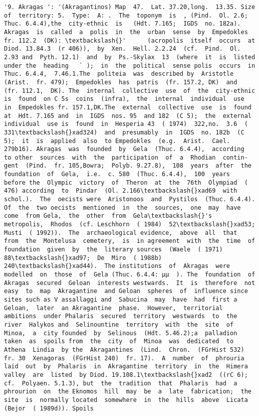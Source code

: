 \documentclass[11pt]{article}
\begin{document}
\begin{Verbatim}[commandchars=\\\{\}]
         '9. Akragas ': '(Akragantinos) Map  47.  Lat. 37.20,long.  13.35. Size of  territory: 5.  Type:  A: .  The  toponym  is  , (Pind.  Ol. 2.6;  Thuc. 6.4.4),the  city-ethnic  is   (Hdt. 7.165;  IGDS  no. 182a). Akragas  is  called  a  polis  in  the  urban  sense  by  Empedokles fr. 112.2  (DK): \textbackslash{}'      (acropolis  itself  occurs  at Diod. 13.84.3  (r 406)),  by  Xen.  Hell. 2.2.24  (cf.  Pind.  Ol. 2.93 and  Pyth. 12.1)  and  by  Ps.-Skylax  13  (where  it  is  listed  under the  heading   ` );  in  the  political  sense polis  occurs  in  Thuc. 6.4.4,  7.46.1.The  politeia  was  described by  Aristotle  (Arist.  fr. 479);  Empedokles  has  patris  (fr. 157.2, DK)  and  (fr. 112.1,  DK). The  internal  collective  use  of  the  city-ethnic  is  found  on C 5s  coins  (infra),  the  internal  individual  use  in  Empedokles fr. 157.1,DK.The  external  collective  use  is  found  at  Hdt. 7.165 and  in  IGDS  nos. 95  and 182  (C 5);  the  external  individual  use is  found  in  Hesperia 43  ( 1974)  322,no.  3.6  ( 331\textbackslash{}xad324)  and  presumably  in  IGDS  no. 182b  (C 5);  it  is  applied  also  to Empedokles  (e.g.  Arist.  Cael. 279b16). Akragas  was  founded  by  Gela  (Thuc. 6.4.4),  according  to other  sources  with  the  participation  of  a  Rhodian  contin- gent  (Pind.  fr. 105,Bowra;  Polyb. 9.27.8),  108  years  after  the foundation  of  Gela,  i.e.  c. 580  (Thuc. 6.4.4),  100  years  before the  Olympic  victory  of  Theron  at  the  76th  Olympiad  ( 476) according  to  Pindar  (Ol. 2.166\textbackslash{}xad69  with  schol.).  The  oecists were  Aristonoos  and  Pystilos  (Thuc. 6.4.4).  Of  the  two oecists  mentioned  in  the  sources,  one  may  have  come  from Gela,  the  other  from  Gela\textbackslash{}'s  metropolis,  Rhodos  (cf. Leschhorn  ( 1984)  52\textbackslash{}xad53;  Musti  ( 1992)).  The  archaeological evidence,  above  all  that  from  the  Montelusa  cemetery,  is  in agreement  with  the  time  of  foundation  given  by  the  literary sources  (Waele  ( 1971)  88\textbackslash{}xad97;  De  Miro  ( 1988b)  240\textbackslash{}xad44).  The institutions  of  Akragas  were  modelled  on  those  of  Gela (Thuc. 6.4.4: µµ  ). The  foundation  of  Akragas  secured  Geloan  interests westwards.  It  is  therefore  not  easy  to  map  Akragantine  and Geloan  spheres  of  influence since sites such as V assallaggi and  Sabucina  may  have  had  first a Geloan,  later  an Akragantine  phase.  However,  territorial  ambitions  under Phalaris  secured  territory  westwards  to  the  river  Halykos and  Selinountine  territory  with  the  site  of  Minoa,  a  city founded  by  Selinous  (Hdt. 5.46.2);a  palladion  taken  as  spoils from  the  city  of  Minoa  was  dedicated  to  Athena  Lindia  by the  Akragantines  (Lind.  Chron.  (FGrHist 532)  fr. 30  Xenagoras  (FGrHist 240)  fr. 17).  A  number  of  phrouria laid  out  by  Phalaris  in  Akragantine  territory  in  the  Himera valley  are  listed  by Diod. 19.108.1\textbackslash{}xad2  ((rC 6);  cf.  Polyaen. 5.1.3), but  the  tradition  that  Phalaris  had  a  phrourion  on  the Eknomos  hill  may  be  a  late  fabrication;  the  site  is  normally located  somewhere  in  the  hills  above  Licata  (Bejor  ( 1989d)). Spoils  
\end{Verbatim}
\end{document}
